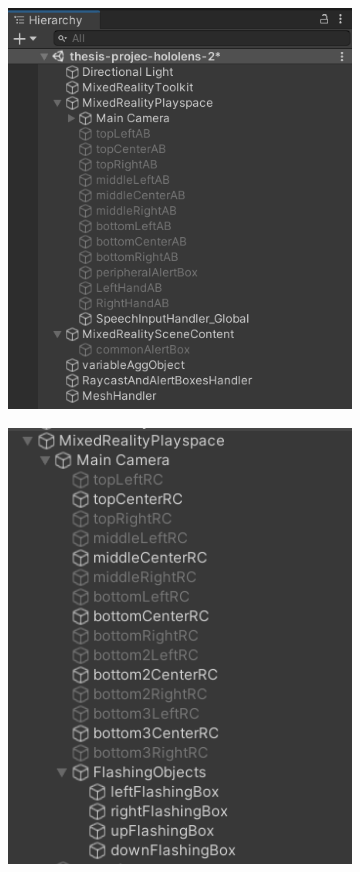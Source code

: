 \begin{figure}[!hb]
    \centering
    \begin{subfigure}{0.5\textwidth}
        \centering
        \includegraphics[width=0.9\linewidth]{images/develop_hierarchyFinalOne.png}
        \caption{}\label{fig:developFinalHierarchyWindowOne}
    \end{subfigure}%
    \begin{subfigure}{0.5\textwidth}
        \centering
        \includegraphics[width=0.825\linewidth]{images/develop_hierarchyFinalTwo.png}

\end{subfigure}
\end{figure}
